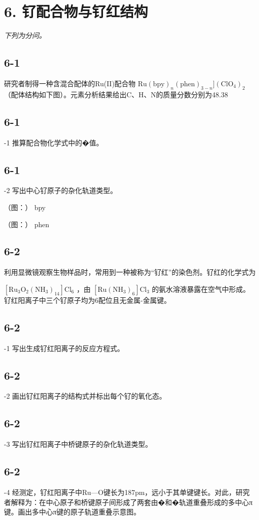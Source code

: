 \section*{6. 钌配合物与钌红结构}
\textit{下列为分问。}

\subsection*{6-1}
研究者制得⼀种含混合配体的Ru(II)配合物 $\mathrm { R u ( b p y ) } _ { n } ( \mathrm { p h e n } ) _ { 3 - n } ] ( \mathrm { C l O } _ { 4 } ) _ { 2 }$ （配体结构如下图）。元素分析结果给出C、H、N的质量分数分别为48.38%

\subsection*{6-1}
-1 推算配合物化学式中的�值。

\subsection*{6-1}
-2 写出中⼼钌原⼦的杂化轨道类型。

（图：）
bpy

（图：）
phen

\subsection*{6-2}
利⽤显微镜观察⽣物样品时，常⽤到⼀种被称为“钌红”的染⾊剂。钌红的化学式为

$\mathrm { [ R u _ { 3 } O _ { 2 } ( N H _ { 3 } ) _ { 1 4 } ] C l _ { 6 } }$ ，由 $\mathrm { [ R u ( N H _ { 3 } ) _ { 6 } ] C l _ { 3 } }$ 的氨⽔溶液暴露在空⽓中形成。钌红阳离⼦中三个钌原⼦均为6配位且⽆⾦属-⾦属键。

\subsection*{6-2}
-1 写出⽣成钌红阳离⼦的反应⽅程式。

\subsection*{6-2}
-2 画出钌红阳离⼦的结构式并标出每个钌的氧化态。

\subsection*{6-2}
-3 写出钌红阳离⼦中桥键原⼦的杂化轨道类型。

\subsection*{6-2}
-4 经测定，钌红阳离⼦中Ru—O键⻓为187pm，远⼩于其单键键⻓。对此，研究者解释为：在中⼼原⼦和桥键原⼦间形成了两套由�和�轨道重叠形成的多中⼼π键。画出多中⼼π键的原⼦轨道重叠⽰意图。
